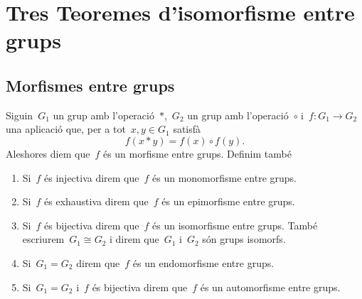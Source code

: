 \documentclass[../../main.tex]{subfiles}
\begin{document}
\section{Tres Teoremes d'isomorfisme entre grups}
    \subsection{Morfismes entre grups}
    \begin{definition}
        \label{def:morfisme entre grups}
        \label{def:monomorfisme entre grups}
        \label{def:epimorfisme entre grups}
        \label{def:isomorfisme entre grups}
        \label{def:endomorfisme entre grups}
        \label{def:automorfisme entre grups}
        Siguin~\(G_{1}\) un grup amb l'operació~\(\ast\),~\(G_{2}\) un grup amb l'operació~\(\circ\) i~\(f\colon G_{1}\to G_{2}\) una aplicació que, per a tot~\(x,y\in G_{1}\) satisfà
        \[
            f(x\ast y)=f(x)\circ f(y).
        \]
        Aleshores diem que~\(f\) és un morfisme entre grups.
        Definim també
        \begin{enumerate}
            \item Si~\(f\) és injectiva direm que~\(f\) és un monomorfisme entre grups.
            \item Si~\(f\) és exhaustiva direm que~\(f\) és un epimorfisme entre grups.
            \item Si~\(f\) és bijectiva direm que~\(f\) és un isomorfisme entre grups.
            També escriurem~\(G_{1}\cong G_{2}\) i direm que~\(G_{1}\) i~\(G_{2}\) són grups isomorfs.
            \item Si~\(G_{1}=G_{2}\) direm que~\(f\) és un endomorfisme entre grups.
            \item Si~\(G_{1}=G_{2}\) i~\(f\) és bijectiva direm que~\(f\) és un automorfisme entre grups.
        \end{enumerate}
    \end{definition}
\end{document}
